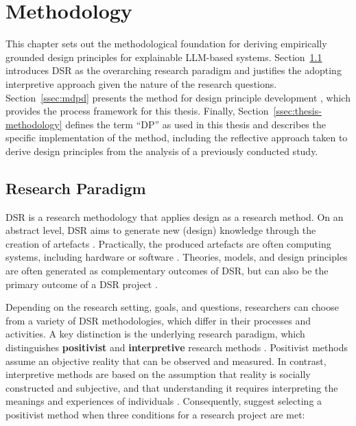 \section{Methodology} \label{sec:methodology}

This chapter sets out the methodological foundation for deriving empirically grounded design principles for explainable \ac{LLM}-based systems. Section~\ref{ssec:research-paradigm} introduces \ac{DSR} as the overarching research paradigm and justifies the adopting interpretive approach given the nature of the research questions. Section~\ref{ssec:mdpd} presents the method for design principle development \parencite{Moeller2020}, which provides the process framework for this thesis. Finally, Section~\ref{ssec:thesis-methodology} defines the term \enquote{\acl{DP}} as used in this thesis and describes the specific implementation of the method, including the reflective approach taken to derive design principles from the analysis of a previously conducted study.

\subsection{Research Paradigm} \label{ssec:research-paradigm}

\ac{DSR} is a research methodology that applies design as a research method. On an abstract level, \ac{DSR} aims to generate new (design) knowledge through the creation of artefacts \parencite{Hevner2004,Vaishnavi2015}. Practically, the produced artefacts are often computing systems, including hardware or software \parencite[e.g.,][]{Toreini2018}. Theories, models, and design principles are often generated as complementary outcomes of \ac{DSR}, but can also be the primary outcome of a \ac{DSR} project \parencite[e.g.,][]{Bitzer2016, Scheider2023}.

Depending on the research setting, goals, and questions, researchers can choose from a variety of \ac{DSR} methodologies, which differ in their processes and activities. A key distinction is the underlying research paradigm, which distinguishes \textbf{positivist} and \textbf{interpretive} research methods \parencite{Venable2017}. Positivist methods assume an objective reality that can be observed and measured. In contrast, interpretive methods are based on the assumption that reality is socially constructed and subjective, and that understanding it requires interpreting the meanings and experiences of individuals \parencite{Chen2004}. Consequently, \textcite{Venable2017} suggest selecting a positivist method when three conditions for a research project are met:

